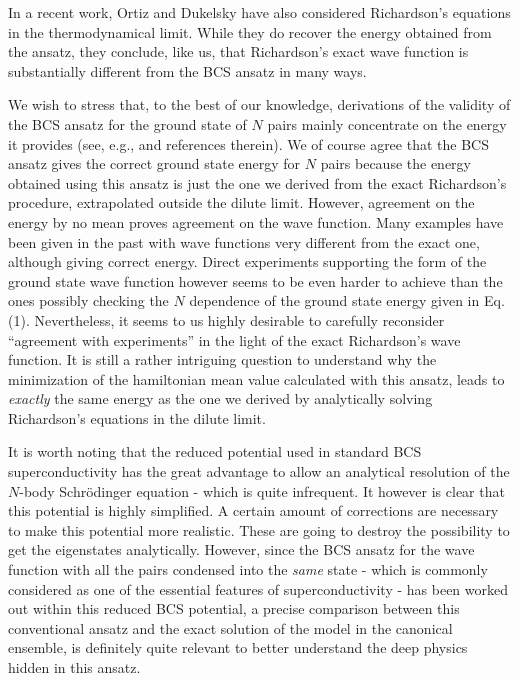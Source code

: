 \documentclass[epj]{svjour}
\begin{document}
In a recent work, Ortiz and Dukelsky\cite{crossoverRich} have also considered Richardson's equations in the thermodynamical limit. While they do recover the energy obtained from the ansatz, they conclude, like us, that Richardson's exact wave function is substantially different from the BCS ansatz in many ways.   


We wish to stress that, 
to the best of our knowledge,  derivations of the validity of the BCS ansatz for the ground state of $N$ pairs
mainly concentrate on the energy it provides 
(see, e.g., \cite{Schrieffer} and references therein).
 We of course agree that the BCS
ansatz gives the correct ground state energy for $N$ pairs because the energy obtained using this ansatz
is just the one we derived from the exact Richardson's procedure, extrapolated outside the dilute limit. However,
agreement on the energy by no mean proves agreement on the wave function.
Many examples have been given in the past with wave functions very different
from the exact one, although giving correct energy. Direct
experiments supporting the form of the ground state wave function however seems to be even harder to achieve than the ones possibly checking the $N$ dependence of the ground state energy given in Eq.(1). 
Nevertheless, it seems to us highly desirable to carefully reconsider ``agreement 
with experiments'' in the light of the exact Richardson's wave function. It is still a rather intriguing question to understand why the minimization of the hamiltonian mean value calculated with this ansatz, leads to \emph{exactly} the same energy as the one we derived by analytically solving Richardson's equations in the dilute limit.

It is worth noting that the reduced potential used in standard BCS superconductivity has the great advantage to allow an analytical resolution of the $N$-body Schr\"{o}dinger equation - which is quite infrequent. It however is clear that this potential is highly simplified. A certain amount of corrections are necessary to make this potential more realistic. These are going to destroy the possibility to get the eigenstates analytically. However, since the BCS ansatz for the wave function with all the pairs condensed into the \emph{same} state - which is commonly considered as one of the essential features of superconductivity - has been worked out within this reduced BCS potential, a precise comparison between this conventional ansatz and the exact solution of the model in the canonical ensemble, is definitely quite relevant to better understand the deep physics hidden in this ansatz.
\end{document}
